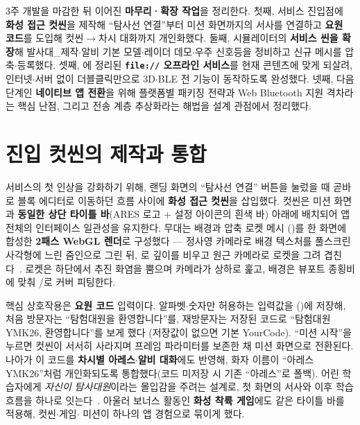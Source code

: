 \begin{summarybox}
3주 개발을 마감한 뒤 이어진 \textbf{마무리·확장 작업}을 정리한다. 첫째, 서비스 진입점에
\textbf{화성 접근 컷씬}을 제작해 ``탐사선 연결''부터 미션 화면까지의 서사를 연결하고
\textbf{요원 코드}를 도입해 컷씬$\to$차시 대화까지 개인화했다. 둘째, 시뮬레이터의
\textbf{서비스 씬을 확장}해 발사대\_제작$\cdot$알비 기본 모델$\cdot$레이더 데모$\cdot$우주
신호등을 정비하고 신규 메시를 압축$\cdot$등록했다. 셋째, 에 정리된
\textbf{\texttt{file://} 오프라인 서비스}를 현재 콘텐츠에 맞게 되살려, 인터넷$\cdot$서버 없이
더블클릭만으로 3D$\cdot$BLE 전 기능이 동작하도록 완성했다. 넷째, 다음 단계인 \textbf{네이티브
앱 전환}을 위해 플랫폼별 패키징 전략과 Web Bluetooth 지원 격차라는 핵심 난점, 그리고 전송
계층 추상화라는 해법을 설계 관점에서 정리했다.
\end{summarybox}

\smallskip
{}

\section{진입 컷씬의 제작과 통합}
서비스의 첫 인상을 강화하기 위해, 랜딩 화면의 ``탐사선 연결'' 버튼을 눌렀을 때 곧바로
블록 에디터로 이동하던 흐름 사이에 \textbf{화성 접근 컷씬}을 삽입했다. 컷씬은 미션 화면과
\textbf{동일한 상단 타이틀 바}(ARES 로고 + 설정 아이콘의 흰색 바) 아래에 배치되어 앱 전체의
인터페이스 일관성을 유지한다. 무대는  배경과 압축 로켓 메시
()를 한 화면에 합성한 \textbf{2패스 WebGL 렌더}로 구성했다 --- 정사영
카메라로 배경 텍스처를 풀스크린 사각형에 느린 줌인으로 그린 뒤, 로
깊이를 비우고 원근 카메라로 로켓을 그려 겹친다~\cite{threejs,akenine2018realtime}. 로켓은
하단에서 추진 화염을 뿜으며 카메라가 상하로 훑고, 배경은 뷰포트 종횡비에 맞춰
/로 커버 피팅한다.

핵심 상호작용은 \textbf{요원 코드} 입력이다. 알파벳$\cdot$숫자만 허용하는 입력값을
()에 저장해, 처음 방문자는 ``탐험대원을
환영합니다''를, 재방문자는 저장된 코드로 ``탐험대원 \textsf{YMK26}, 환영합니다''를 보게 했다
(저장값이 없으면 기본 \textsf{YourCode}). ``미션 시작''을 누르면 컷씬이 서서히 사라지며
프레임 파라미터를 보존한 채 미션 화면으로 전환된다. 나아가 이 코드를 \textbf{차시별
아레스$\cdot$알비 대화}에도 반영해, 화자 이름이 ``아레스 \textsf{YMK26}''처럼 개인화되도록
통합했다(코드 미저장 시 기존 ``아레스''로 폴백). 어린 학습자에게 \emph{자신이 탐사대원}이라는
몰입감을 주려는 설계로, 첫 화면의 서사와 이후 학습 흐름을 하나로 잇는다~\cite{norman2013design}.
아울러 보너스 활동인 \textbf{화성 착륙 게임}에도 같은 타이틀 바를 적용해, 컷씬$\cdot$게임$\cdot$%
미션이 하나의 앱 경험으로 묶이게 했다.

